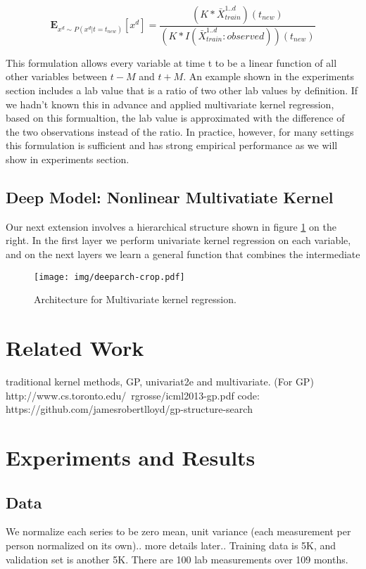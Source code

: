 \documentclass{article} %
\begin{document}
$$ \mathbf{E}_{x^d \sim P(x^d|t=t_{new})}[x^d] = \frac{(K \ast \bar X^{1..d}_{train})(t_{new})}{(K \ast I(\bar X^{1..d}_{train} :observed)) (t_{new})} $$

This formulation allows every variable at time t to be a linear function of all other variables between $t-M$ and $t+M$. An example shown in the experiments section includes a lab value that is a ratio of two other lab values by definition. If we hadn't known this in advance and applied multivariate kernel regression, based on this formualtion, the lab value is approximated with the difference of the two observations instead of the ratio. In practice, however, for many settings this formulation is sufficient and has strong empirical performance as we will show in experiments section.

\subsection{Deep Model: Nonlinear Multivatiate Kernel}

Our next extension involves a hierarchical structure shown in figure \ref{fig:deepkr} on the right. 
In the first layer we perform univariate kernel regression on each variable, and on the next layers we learn a general function that combines the intermediate 


\begin{figure}[h]
\begin{center}
\texttt{[image: img/deeparch-crop.pdf]}
\end{center}
\caption{Architecture for Multivariate kernel regression.}\label{fig:deepkr}
\end{figure}

\section{Related Work}
traditional kernel methods, GP, univariat2e and multivariate.
(For GP)
http://www.cs.toronto.edu/~rgrosse/icml2013-gp.pdf
code: https://github.com/jamesrobertlloyd/gp-structure-search



\section{Experiments and Results}
\subsection{Data}
We normalize each series to be zero mean, unit variance (each measurement per person normalized on its own).. more details later..
Training data is 5K, and validation set is another 5K. There are 100 lab measurements over 109 months. 
\end{document}
